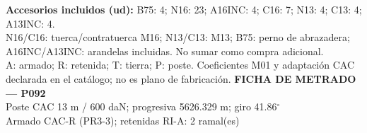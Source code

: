 \begingroup\scriptsize
\textbf{Accesorios incluidos (ud):} B75: 4; N16: 23; A16INC: 4; C16: 7; N13: 4; C13: 4; A13INC: 4.\\
N16/C16: tuerca/contratuerca M16; N13/C13: M13; B75: perno de abrazadera; A16INC/A13INC: arandelas incluidas. No sumar como compra adicional.\\
A: armado; R: retenida; T: tierra; P: poste. Coeficientes M01 y adaptación CAC declarada en el catálogo; no es plano de fabricación.
\endgroup\endgroup
\clearpage{}
\begingroup\small\setlength{\parskip}{3pt}\renewcommand{\arraystretch}{1.05}
\textbf{\large FICHA DE METRADO — P092}\\[4pt]
Poste CAC 13 m / 600 daN; progresiva 5626.329 m; giro 41.86\ensuremath{^\circ}\\
Armado CAC-R (PR3-3); retenidas RI-A: 2 ramal(es)\\
\begingroup\scriptsize
